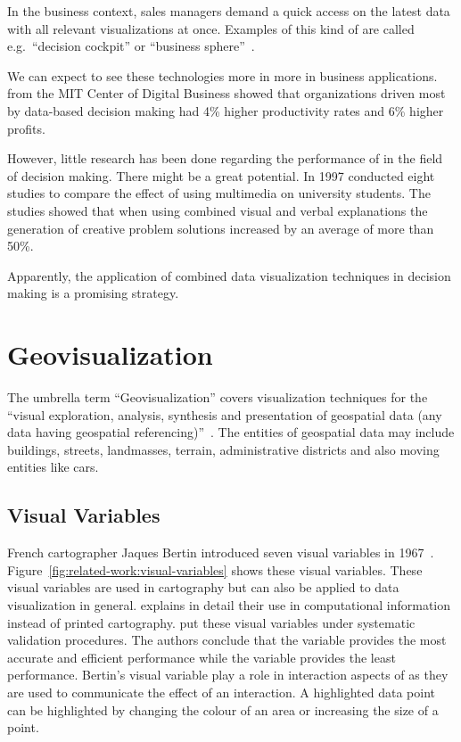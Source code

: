 In the business context, sales managers demand a quick access on the latest data with all relevant visualizations at once.
Examples of this kind of \dss{} are called e.g.\ ``decision cockpit'' or ``business sphere''~\parencite{Davenport2013}.

We can expect to see these technologies more in more in business applications.
\textcite{McAfee2012} from the MIT Center of Digital Business showed that organizations driven most by data-based decision making had 4\% higher productivity rates and 6\% higher profits.

However, little research has been done regarding the performance of \cmvs{} in the field of decision making.
There might be a great potential.
In 1997 \textcite{Mayer1997} conducted eight studies to compare the effect of using multimedia on university students.
The studies showed that when using combined visual and verbal explanations the generation of creative problem solutions increased by an average of more than 50\%.

Apparently, the application of combined data visualization techniques in decision making is a promising strategy.


\section{Geovisualization}
The umbrella term ``Geovisualization'' covers visualization techniques for the ``visual exploration, analysis, synthesis and presentation of geospatial data (any data having geospatial  referencing)''~\parencite{Maceachren2001}.
The entities of geospatial data may include buildings, streets, landmasses, terrain, administrative districts and also moving entities like cars.

\subsection{Visual Variables}\label{sec:related-work:visual-variables}
French cartographer Jaques Bertin introduced seven visual variables in 1967~\parencite{Bertin2010}.
Figure~\ref{fig:related-work:visual-variables} shows these visual variables.
These visual variables are used in cartography but can also be applied to data visualization in general.
\textcite{Carpendale2003} explains in detail their use in computational information instead of printed cartography.
\textcite{Garlandini2009} put these visual variables under systematic validation procedures.
The authors conclude that the variable  provides the most accurate and efficient performance while the variable  provides the least performance.
Bertin's visual variable play a role in interaction aspects of \cmvs{} as they are used to communicate the effect of an interaction.
A highlighted data point can be highlighted by changing the colour of an area or increasing the size of a point.

